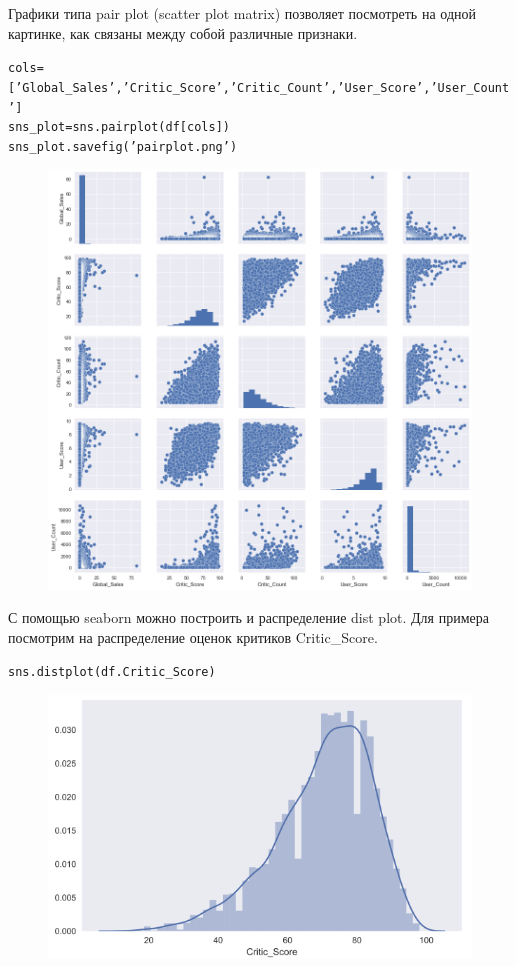 \documentclass{beamer}
\begin{document}
\begin{frame}[fragile]
Графики типа pair plot (scatter plot matrix) позволяет посмотреть на одной картинке, как связаны между собой различные признаки. 
\begin{alltt}
cols = ['Global_Sales', 'Critic_Score', 'Critic_Count', 'User_Score', 'User_Count']
sns_plot = sns.pairplot(df[cols])
sns_plot.savefig('pairplot.png')
\end{alltt}
\begin{figure}[h]
\centering
\includegraphics[scale=0.2]{images/seaborn-04.png}
\end{figure}
\end{frame}

\begin{frame}[fragile]
С помощью seaborn можно построить и распределение dist plot. Для примера посмотрим на распределение оценок критиков Critic\_Score. 
\begin{alltt}
sns.distplot(df.Critic_Score)
\end{alltt}
\begin{figure}[h]
\centering
\includegraphics[scale=0.5]{images/seaborn-05.png}
\end{figure}
\end{frame}
\end{document}
